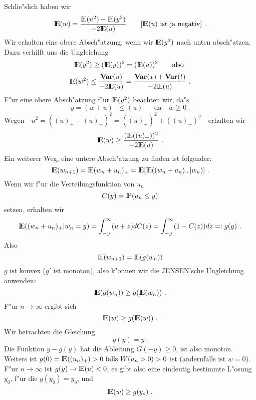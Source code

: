 Schlie"slich haben wir
\[{\rm I\kern-0.2em E}(w) = \frac{{\rm I\kern-0.2em E}(u^{2})-{\rm I\kern-0.2em E}(y^{2})}{-2{\rm I\kern-0.2em E}(u)} \qquad [{\rm I\kern-0.2em E}(u) \mbox{ ist ja negativ}] ~.\]
Wir erhalten eine obere Absch"atzung, wenn wir ${\rm I\kern-0.2em E}(y^{2})$ nach unten absch"atzen. Dazu verhilft uns die Ungleichung
\[{\rm I\kern-0.2em E}(y^{2}) \geq ({\rm I\kern-0.2em E}(y))^{2} = ({\rm I\kern-0.2em E}(u))^{2} \qquad  \mbox{also }\]
\[{\rm I\kern-0.2em E}(w^{2}) \leq \frac{{\bf Var}(u)}{-2{\rm I\kern-0.2em E}(u)} = \frac{{\bf Var}(x)+{\bf Var}(t)}{-2{\rm I\kern-0.2em E}(u)} ~.\]
F"ur eine obere Absch"atzung f"ur ${\rm I\kern-0.2em E}(y^{2})$ beachten wir, da"s
\[y=(w+u)_{-} \leq (u)_{-} \quad \mbox{da} \quad w \geq 0 ~.\]
Wegen$ \quad u^{2} = ((u)_{+}-(u)_{-})^{2} = ((u)_{+})^{2}+((u)_{-})^{2} \quad $erhalten wir
\[{\rm I\kern-0.2em E}(w) \geq \frac{({\rm I\kern-0.2em E}((u)_{+}))^{2}}{-2{\rm I\kern-0.2em E}(u)} ~.\]
Ein weiterer Weg, eine untere Absch"atzung zu finden ist folgender:
\[{\rm I\kern-0.2em E}(w_{n+1}) = {\rm I\kern-0.2em E}(w_{n}+u_{n})_{+} = {\rm I\kern-0.2em E}[{\rm I\kern-0.2em E}((w_{n}+u_{n})_{+}\vert w_{n})] ~.\] 
Wenn wir f"ur die Verteilungsfunktion von $u_{n}$
\[C(y)={\rm I\kern-0.2em P}(u_{n} \leq y)    \]
setzen, erhalten wir
\[{\rm I\kern-0.2em E}((w_{n}+u_{n})_{+} \vert w_{n} = y) = \int_{-y}^{\infty}(u+z)dC(z) = \int_{-y}^{\infty}(1-C(z))dz =: g(y) ~.\]
Also
\[{\rm I\kern-0.2em E}(w_{n+1}) = {\rm I\kern-0.2em E}(g(w_{n}))\]
$g$ ist konvex ($g'$ ist monoton), also k"onnen wir die JENSEN'sche Ungleichung anwenden:
\[{\rm I\kern-0.2em E}(g(w_{n})) \geq g({\rm I\kern-0.2em E}(w_{n}))~.\]
F"ur $n \rightarrow \infty$ ergibt sich
\[{\rm I\kern-0.2em E}(w) \geq g({\rm I\kern-0.2em E}(w)) ~.\]
Wir betrachten die Gleichung 
\[g(y) = y ~.\]
Die Funktion $y-g(y)$ hat die Ableitung $G(-y) \geq 0$, ist also monoton.\\
Weiters ist $g(0) = {\rm I\kern-0.2em E}((u_{n})_{+}) > 0 \mbox{ falls } W(u_{n} > 0) > 0$ ist (andernfalls ist $w = 0$).\\
F"ur $n \rightarrow \infty$ ist $g(y) \rightarrow {\rm I\kern-0.2em E}(u) < 0$, es gibt also eine eindeutig bestimmte L"osung $y_{0}$, f"ur die $g(y_{0}) = y_{o}$, und 
\[{\rm I\kern-0.2em E}(w) \geq g(y_{o}) ~.\]

